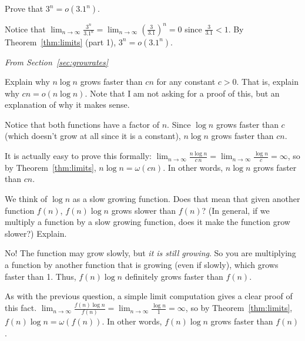 \begin{requ}
Prove that $3^n=o(3.1^n)$.
\begin{requanswer}
Notice that 
$\displaystyle \lim_{n\rightarrow\infty} \frac{3^n}{3.1^n} = \lim_{n\rightarrow\infty} \left(\frac{3}{3.1}\right)^n=0$
since $\frac{3}{3.1}<1$. By Theorem~\ref{thm:limits} (part 1), $3^n=o(3.1^n)$.
\end{requanswer}
\end{requ}


\noindent
{\em From Section~\ref{sec:growrates}}

\begin{requ}
Explain why $n\log n$ grows faster than $c n$ for any constant $c>0$.
That is, explain why $c n=o(n\log n)$.
Note that I am not asking for a proof of this, but
an explanation of why it makes sense.
\begin{requanswer}
Notice that both functions have a factor of $n$. Since $\log n$ grows faster than $c$ (which doesn't grow at all since
it is a constant), $n\log n$ grows faster than $c n$.

It is actually easy to prove this formally: 
$\displaystyle\lim_{n\rightarrow\infty} \frac{n\log n}{c\, n} = \lim_{n\rightarrow\infty} \frac{\log n}{c} =\infty$,
so by Theorem~\ref{thm:limits}, $n\log n=\omega(c n)$. In other words, $n\log n$ grows faster than $c n$.

\end{requanswer}
\end{requ}

\begin{requ}
We think of $\log n$ as a slow growing function.
Does that mean that given another function $f(n)$, $f(n) \log n$ grows slower than $f(n)$?
(In general, if we multiply a function by a slow growing function, does it make the function grow slower?)
Explain.
\begin{requanswer}
No! The function may grow slowly, but {\em it is still growing}. 
So you are multiplying a function by another function that is growing (even if slowly), which grows faster than 1.
Thus, $f(n)\log n$ definitely grows faster than $f(n)$.

As with the previous question, a simple limit computation gives a clear proof of this fact.
$\displaystyle\lim_{n\rightarrow\infty} \frac{f(n)\log n}{f(n)} = \lim_{n\rightarrow\infty} \frac{\log n}{1} =\infty$,
so by Theorem~\ref{thm:limits}, $f(n)\log n=\omega(f(n))$. In other words, $f(n)\log n$ grows faster than $f(n)$.

\end{requanswer}
\end{requ}

